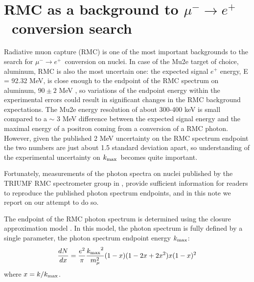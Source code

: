\documentclass[12pt]{article}
\newcommand {\kmax}         {\mbox{$k_{\rm max}$}}
\newcommand {\MuMinusEPlus} {\mbox{$\mu^- \rightarrow e^+$}}
\begin{document}
\section{ RMC as a background to \MuMinusEPlus\ conversion search }
% 
% 

Radiative muon capture (RMC) is one of the most important backgrounds to the search for
\MuMinusEPlus\ conversion on nuclei. In case of the Mu2e target of choice, aluminum,
RMC is also the most uncertain one: the expected signal $e^+$ energy, E = 92.32 MeV,
is close enough to the endpoint of the RMC spectrum on aluminum,
$90 \pm 2$ MeV \cite{RMC_1999_PhysRevC.59.2853}, so variations of the endpoint
energy within the experimental errors could result in significant changes
in the RMC background expectations.
%
The Mu2e energy resolution of about 300-400 keV
is small compared to a $\sim$ 3 MeV difference between the expected signal energy
and the maximal energy of a positron coming from a conversion of a RMC photon.
However, given the published 2 MeV uncertainty on the RMC spectrum endpoint the two 
numbers are just about 1.5 standard deviation apart, so understanding of the
experimental uncertainty on \kmax\ becomes quite important.

Fortunately, measurements of the photon spectra on nuclei published 
by the TRIUMF RMC spectrometer group in \cite{RMC_1992_PhysRevC.46.1094},
\cite{RMC_1999_PhysRevC.59.2853} provide sufficient information for readers
to reproduce the published photon spectrum endpoints, and in this note
we report on our attempt to do so.

The endpoint of the RMC photon spectrum is determined using the closure
approximation model \cite{RMC_1979_CERN_REF-TH-2967}.
In this model, the photon spectrum is fully defined by a single parameter,
the photon spectrum endpoint energy \kmax:
$$
   {dN \over dx} = {e^2 \over \pi} {\kmax^2 \over {m_\mu^2}}  (1-x) (1-2x+2x^2) x (1-x)^2
$$
where $x = k/\kmax$.
\end{document}
